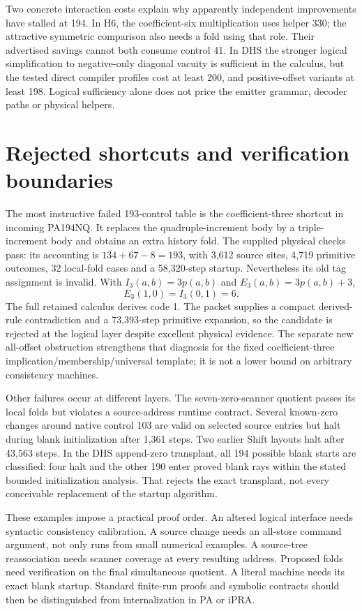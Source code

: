 \documentclass[10pt]{article}
\begin{document}
Two concrete interaction costs explain why apparently independent improvements
have stalled at 194. In H6, the coefficient-six multiplication uses helper
330; the attractive symmetric comparison also needs a fold using that role.
Their advertised savings cannot both consume control 41. In DHS the stronger
logical simplification to negative-only diagonal vacuity is sufficient in the
calculus, but the tested direct compiler profiles cost at least 200, and
positive-offset variants at least 198. Logical sufficiency alone does not
price the emitter grammar, decoder paths or physical helpers.

\section{Rejected shortcuts and verification boundaries}

The most instructive failed 193-control table is the coefficient-three
shortcut in incoming PA194NQ. It replaces the quadruple-increment body by a
triple-increment body and obtains an extra history fold. The supplied physical
checks pass: its accounting is \(134+67-8=193\), with 3,612 source sites,
4,719 primitive outcomes, 32 local-fold cases and a 58,320-step startup.
Nevertheless its old tag assignment is invalid. With
\(I_3(a,b)=3p(a,b)\) and \(E_3(a,b)=3p(a,b)+3\),
\[
E_3(1,0)=I_3(0,1)=6.
\]
The full retained calculus derives code 1. The packet supplies a compact
derived-rule contradiction and a 73,393-step primitive expansion, so the
candidate is rejected at the logical layer despite excellent physical evidence.
The separate new all-offset obstruction strengthens that diagnosis for the
fixed coefficient-three implication/membership/universal template; it is
not a lower bound on arbitrary consistency machines.

Other failures occur at different layers. The seven-zero-scanner quotient
passes its local folds but violates a source-address runtime contract. Several
known-zero changes around native control 103 are valid on selected source
entries but halt during blank initialization after 1,361 steps. Two earlier
Shift layouts halt after 43,563 steps. In the DHS append-zero transplant,
all 194 possible blank starts are classified: four halt and the other 190
enter proved blank rays within the stated bounded initialization analysis.
That rejects the exact transplant, not every conceivable replacement of
the startup algorithm.

These examples impose a practical proof order. An altered logical interface
needs syntactic consistency calibration. A source change needs an all-store
command argument, not only runs from small numerical examples. A source-tree
reassociation needs scanner coverage at every resulting address. Proposed
folds need verification on the final simultaneous quotient. A literal machine
needs its exact blank startup. Standard finite-run proofs and symbolic
contracts should then be distinguished from internalization in PA or iPRA.
\end{document}
